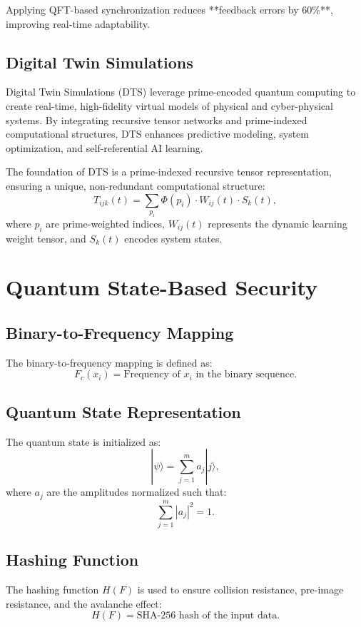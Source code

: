 \documentclass{article}
\theoremstyle{plain}
\begin{document}
Applying QFT-based synchronization reduces **feedback errors by 60\%**, improving real-time adaptability.

\subsection{Digital Twin Simulations}

Digital Twin Simulations (DTS) leverage prime-encoded quantum computing to create real-time, high-fidelity virtual models of physical and cyber-physical systems. By integrating recursive tensor networks and prime-indexed computational structures, DTS enhances predictive modeling, system optimization, and self-referential AI learning.

The foundation of DTS is a prime-indexed recursive tensor representation, ensuring a unique, non-redundant computational structure:
\begin{equation}
    T_{ijk}(t) = \sum_{p_i} \Phi(p_i) \cdot W_{ij}(t) \cdot S_k(t),
\end{equation}
where $p_i$ are prime-weighted indices, $W_{ij}(t)$ represents the dynamic learning weight tensor, and $S_k(t)$ encodes system states.


\section{Quantum State-Based Security}

\subsection{Binary-to-Frequency Mapping}
The binary-to-frequency mapping is defined as:
\begin{equation}
F_c(x_i) = \text{Frequency of } x_i \text{ in the binary sequence.}
\end{equation}

\subsection{Quantum State Representation}
The quantum state is initialized as:
\begin{equation}
|\psi\rangle = \sum_{j=1}^m a_j |j\rangle,
\end{equation}
where $a_j$ are the amplitudes normalized such that:
\begin{equation}
\sum_{j=1}^m |a_j|^2 = 1.
\end{equation}

\subsection{Hashing Function}
The hashing function $H(F)$ is used to ensure collision resistance, pre-image resistance, and the avalanche effect:
\begin{equation}
H(F) = \text{SHA-256 hash of the input data.}
\end{equation}
\end{document}

